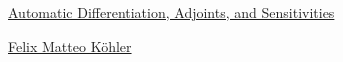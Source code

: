 \documentclass[11pt]{article}
\begin{document}
	\kaishu 
	\setcounter{section}{0}
	\begin{center}
		{\LARGE  \href{https://www.youtube.com/playlist?list=PLISXH-iEM4Jk27AmSvISooRRKH4WtlWKP}{Automatic Differentiation, Adjoints, and Sensitivities}}
		
		
		{\large \href{https://fkoehler.site/}{Felix Matteo K\"{o}hler}}
	\end{center}
\setcounter{page}{1}



\end{document}
